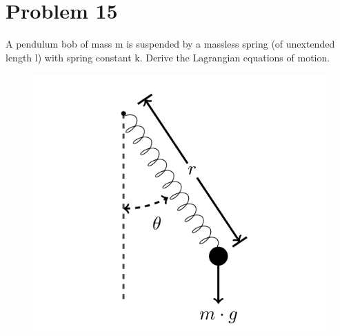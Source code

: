 \documentclass{article}
\begin{document}
\section*{Problem 15} 
A pendulum bob of mass m is suspended by a massless spring (of unextended length l) with spring constant k. Derive the Lagrangian equations of motion.
\begin{figure}[h]
	\includegraphics[scale=0.30]{P15}
	\centering
\end{figure}
\end{document}
